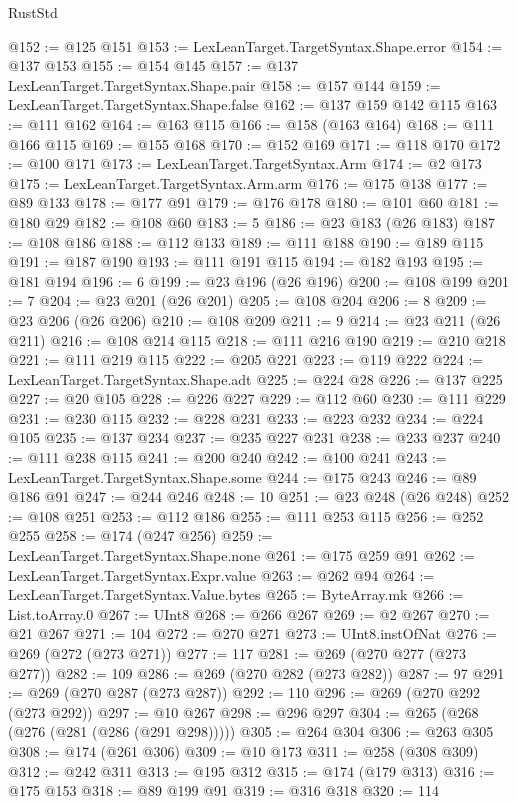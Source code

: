\begin{lexlean}{RustStd}
\begin{coremodule}
@152 := @125 @151
@153 := LexLeanTarget.TargetSyntax.Shape.error
@154 := @137 @153
@155 := @154 @145
@157 := @137 LexLeanTarget.TargetSyntax.Shape.pair
@158 := @157 @144
@159 := LexLeanTarget.TargetSyntax.Shape.false
@162 := @137 @159 @142 @115
@163 := @111 @162
@164 := @163 @115
@166 := @158 (@163 @164)
@168 := @111 @166 @115
@169 := @155 @168
@170 := @152 @169
@171 := @118 @170
@172 := @100 @171
@173 := LexLeanTarget.TargetSyntax.Arm
@174 := @2 @173
@175 := LexLeanTarget.TargetSyntax.Arm.arm
@176 := @175 @138
@177 := @89 @133
@178 := @177 @91
@179 := @176 @178
@180 := @101 @60
@181 := @180 @29
@182 := @108 @60
@183 := 5
@186 := @23 @183 (@26 @183)
@187 := @108 @186
@188 := @112 @133
@189 := @111 @188
@190 := @189 @115
@191 := @187 @190
@193 := @111 @191 @115
@194 := @182 @193
@195 := @181 @194
@196 := 6
@199 := @23 @196 (@26 @196)
@200 := @108 @199
@201 := 7
@204 := @23 @201 (@26 @201)
@205 := @108 @204
@206 := 8
@209 := @23 @206 (@26 @206)
@210 := @108 @209
@211 := 9
@214 := @23 @211 (@26 @211)
@216 := @108 @214 @115
@218 := @111 @216 @190
@219 := @210 @218
@221 := @111 @219 @115
@222 := @205 @221
@223 := @119 @222
@224 := LexLeanTarget.TargetSyntax.Shape.adt
@225 := @224 @28
@226 := @137 @225
@227 := @20 @105
@228 := @226 @227
@229 := @112 @60
@230 := @111 @229
@231 := @230 @115
@232 := @228 @231
@233 := @223 @232
@234 := @224 @105
@235 := @137 @234
@237 := @235 @227 @231
@238 := @233 @237
@240 := @111 @238 @115
@241 := @200 @240
@242 := @100 @241
@243 := LexLeanTarget.TargetSyntax.Shape.some
@244 := @175 @243
@246 := @89 @186 @91
@247 := @244 @246
@248 := 10
@251 := @23 @248 (@26 @248)
@252 := @108 @251
@253 := @112 @186
@255 := @111 @253 @115
@256 := @252 @255
@258 := @174 (@247 @256)
@259 := LexLeanTarget.TargetSyntax.Shape.none
@261 := @175 @259 @91
@262 := LexLeanTarget.TargetSyntax.Expr.value
@263 := @262 @94
@264 := LexLeanTarget.TargetSyntax.Value.bytes
@265 := ByteArray.mk
@266 := List.toArray.{0}
@267 := UInt8
@268 := @266 @267
@269 := @2 @267
@270 := @21 @267
@271 := 104
@272 := @270 @271
@273 := UInt8.instOfNat
@276 := @269 (@272 (@273 @271))
@277 := 117
@281 := @269 (@270 @277 (@273 @277))
@282 := 109
@286 := @269 (@270 @282 (@273 @282))
@287 := 97
@291 := @269 (@270 @287 (@273 @287))
@292 := 110
@296 := @269 (@270 @292 (@273 @292))
@297 := @10 @267
@298 := @296 @297
@304 := @265 (@268 (@276 (@281 (@286 (@291 @298)))))
@305 := @264 @304
@306 := @263 @305
@308 := @174 (@261 @306)
@309 := @10 @173
@311 := @258 (@308 @309)
@312 := @242 @311
@313 := @195 @312
@315 := @174 (@179 @313)
@316 := @175 @153
@318 := @89 @199 @91
@319 := @316 @318
@320 := 114

\end{coremodule}
\end{lexlean}
